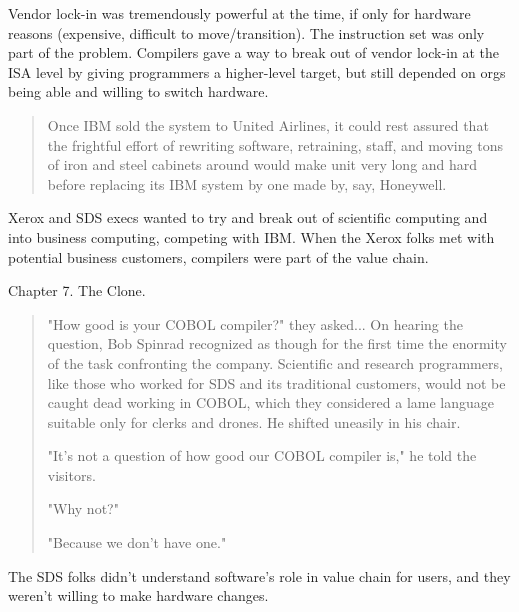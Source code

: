 Vendor lock-in was tremendously powerful at the time, if only for hardware reasons (expensive, difficult to move/transition).
The instruction set was only part of the problem.
Compilers gave a way to break out of vendor lock-in at the ISA level by giving programmers
a higher-level target, but still depended on orgs being able and willing to switch hardware.
\begin{quotation}
Once IBM sold the system to United Airlines, it could rest assured that the frightful effort of rewriting software,
retraining, staff, and moving tons of iron and steel cabinets around would make unit very long and hard before 
replacing its IBM system by one made by, say, Honeywell.
\end{quotation}

Xerox and SDS execs wanted to try and break out of scientific computing and into business computing,
competing with IBM.
When the Xerox folks met with potential business customers, compilers were part of the value chain.

Chapter 7. The Clone.

\begin{quotation}
"How good is your COBOL compiler?" they asked...
On hearing the question, Bob Spinrad recognized as though for the first time the enormity of the task confronting the company.
Scientific and research programmers, like those who worked for SDS and its traditional customers,
would not be caught dead working in COBOL, which they considered a lame language suitable only for clerks and drones.
He shifted uneasily in his chair.

"It's not a question of how good our COBOL compiler is," he told the visitors.

"Why not?"

"Because we don't have one."
\end{quotation}

The SDS folks didn't understand software's role in value chain for users,
and they weren't willing to make hardware changes.

